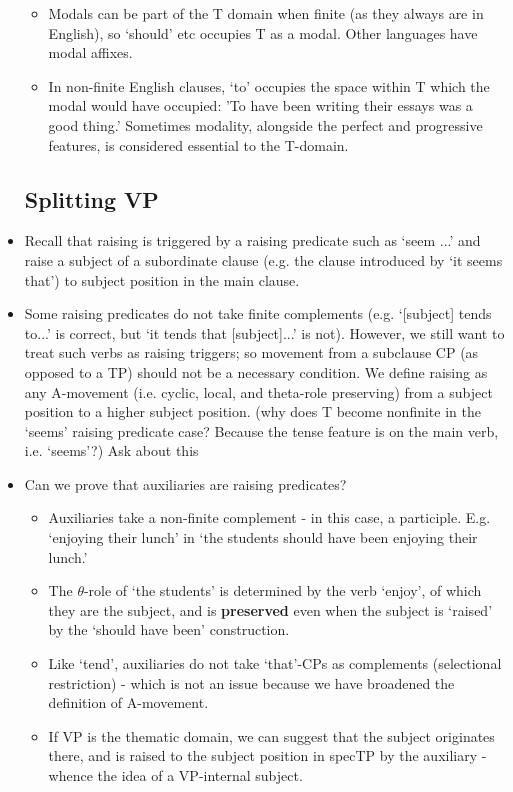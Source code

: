 \documentclass{article}
\begin{document}
\begin{itemize}
\begin{itemize}
    \item Modals can be part of the T domain when finite (as they always are in English), so `should' etc occupies T as a modal. Other languages have modal affixes.
    \item In non-finite English clauses, `to' occupies the space within T which the modal would have occupied: 'To have been writing their essays was a good thing.' Sometimes modality, alongside the perfect and progressive features, is considered essential to the T-domain.
\end{itemize}
\subsection{Splitting VP}
\item Recall that raising is triggered by a raising predicate such as `seem ...' and raise a subject of a subordinate clause (e.g. the clause introduced by `it seems that') to subject position in the main clause.
\item Some raising predicates do not take finite complements (e.g. `[subject] tends to...' is correct, but `it tends that [subject]...' is not). However, we still want to treat such verbs as raising triggers; so movement from a subclause CP (as opposed to a TP) should not be a necessary condition. We define raising as any A-movement (i.e. cyclic, local, and theta-role preserving) from a subject position to a higher subject position. (why does T become nonfinite in the `seems' raising predicate case? Because the tense feature is on the main verb, i.e. `seems'?) Ask about this
\item Can we prove that auxiliaries are raising predicates?
\begin{itemize}
    \item Auxiliaries take a non-finite complement - in this case, a participle. E.g. `enjoying their lunch' in `the students should have been enjoying their lunch.' 
    \item The $\theta$-role of `the students' is determined by the verb `enjoy', of which they are the subject, and is \textbf{preserved} even when the subject is `raised' by the `should have been' construction.
    \item Like `tend', auxiliaries do not take `that'-CPs as complements (selectional restriction) - which is not an issue because we have broadened the definition of A-movement.
    \item If VP is the thematic domain, we can suggest that the subject originates there, and is raised to the subject position in specTP by the auxiliary - whence the idea of a VP-internal subject.

\end{itemize}
\end{itemize}
\end{document}
